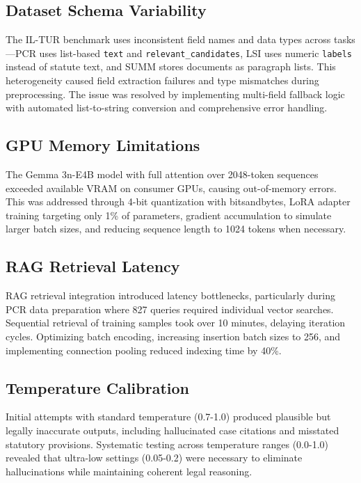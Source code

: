 \documentclass[11pt]{article}
\begin{document}
\subsection{Dataset Schema Variability}

The IL-TUR benchmark uses inconsistent field names and data types across tasks—PCR uses list-based \texttt{text} and \texttt{relevant\_candidates}, LSI uses numeric \texttt{labels} instead of statute text, and SUMM stores documents as paragraph lists. This heterogeneity caused field extraction failures and type mismatches during preprocessing. The issue was resolved by implementing multi-field fallback logic with automated list-to-string conversion and comprehensive error handling.

\subsection{GPU Memory Limitations}

The Gemma 3n-E4B model with full attention over 2048-token sequences exceeded available VRAM on consumer GPUs, causing out-of-memory errors. This was addressed through 4-bit quantization with bitsandbytes, LoRA adapter training targeting only 1\% of parameters, gradient accumulation to simulate larger batch sizes, and reducing sequence length to 1024 tokens when necessary.

\subsection{RAG Retrieval Latency}

RAG retrieval integration introduced latency bottlenecks, particularly during PCR data preparation where 827 queries required individual vector searches. Sequential retrieval of training samples took over 10 minutes, delaying iteration cycles. Optimizing batch encoding, increasing insertion batch sizes to 256, and implementing connection pooling reduced indexing time by 40\%.

\subsection{Temperature Calibration}

Initial attempts with standard temperature (0.7-1.0) produced plausible but legally inaccurate outputs, including hallucinated case citations and misstated statutory provisions. Systematic testing across temperature ranges (0.0-1.0) revealed that ultra-low settings (0.05-0.2) were necessary to eliminate hallucinations while maintaining coherent legal reasoning.
\end{document}
